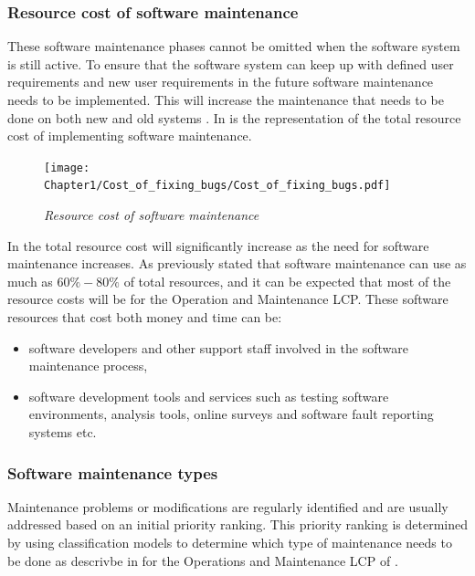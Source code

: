 \subsubsection{Resource cost of software maintenance}
These software maintenance phases cannot be omitted when the software system is still active. To ensure that the software system can keep up with defined user requirements and new user requirements in the future software maintenance needs to be implemented.  This will increase the maintenance that needs to be done on both new and old systems \cite{Niu2018, Galster2019, Hasan2012}. In  is the representation of the total resource cost of implementing software maintenance.

\begin{figure}[!htb]
	\centering %
	\texttt{[image: Chapter1/Cost\_of\_fixing\_bugs/Cost\_of\_fixing\_bugs.pdf]}
	\caption[Resource cost of software maintenance]
	{\textit{Resource cost of software maintenance \cite{Ogheneovo2014}}}\label{fig:ch1_costsOfFixingBugs}
\end{figure}

In  the total resource cost will significantly increase as the need for software maintenance increases. As previously stated that software maintenance can use as much as $60\%-80\%$ of total resources, and it can be expected that most of the resource costs will be for the Operation and Maintenance LCP. These software resources that cost both money and time can be:

\begin{itemize}
	\item software developers and other support staff involved in the software maintenance process,
	\item software development tools and services such as testing software environments, analysis tools, online surveys and software fault reporting systems etc.
\end{itemize}

\subsubsection{Software maintenance types}
Maintenance problems or modifications are regularly identified and are usually addressed based on an initial priority ranking. This priority ranking is determined by using classification models to determine which type of maintenance needs to be done as descrivbe in  for the Operations and Maintenance LCP of  \cite{Tang2010, Mamone1994, Ping2010}.

